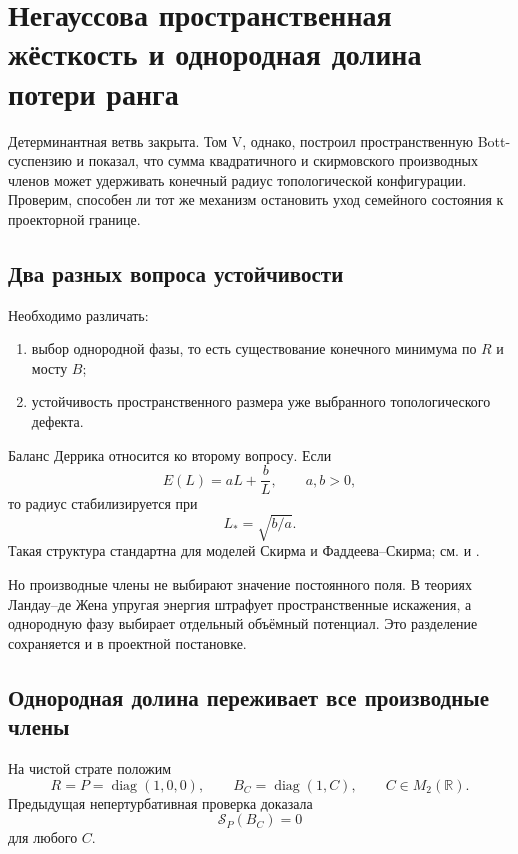 \chapter{Негауссова пространственная жёсткость и однородная долина потери ранга}

Детерминантная ветвь закрыта. Том V, однако, построил пространственную
Bott-суспензию и показал, что сумма квадратичного и скирмовского
производных членов может удерживать конечный радиус топологической
конфигурации. Проверим, способен ли тот же механизм остановить уход
семейного состояния к проекторной границе.

\section{Два разных вопроса устойчивости}

Необходимо различать:
\begin{enumerate}
 \item выбор однородной фазы, то есть существование конечного минимума по
 $R$ и мосту $B$;
 \item устойчивость пространственного размера уже выбранного
 топологического дефекта.
\end{enumerate}
Баланс Деррика относится ко второму вопросу. Если
\begin{equation}
 E(L)=aL+\frac bL,
 \qquad a,b>0,
\end{equation}
то радиус стабилизируется при
\begin{equation}
 L_*=\sqrt{b/a}.
 \label{eq:v6-spatial-stiffness-derrick-radius}
\end{equation}
Такая структура стандартна для моделей Скирма и Фаддеева--Скирма; см.
 и .

Но производные члены не выбирают значение постоянного поля. В теориях
Ландау--де Жена упругая энергия штрафует пространственные искажения, а
однородную фазу выбирает отдельный объёмный потенциал. Это разделение
сохраняется и в проектной постановке.

\section{Однородная долина переживает все производные члены}

На чистой страте положим
\begin{equation}
 R=P=\operatorname{diag}(1,0,0),
 \qquad
 B_C=\operatorname{diag}(1,C),
 \qquad C\in M_2(\mathbb R).
 \label{eq:v6-spatial-stiffness-uniform-valley}
\end{equation}
Предыдущая непертурбативная проверка доказала
\begin{equation}
 \mathcal S_P(B_C)=0
\end{equation}
для любого $C$.

